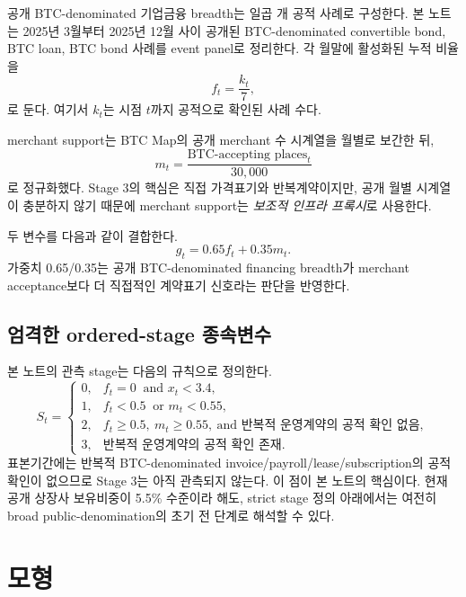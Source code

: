 \documentclass[11pt,a4paper]{article}
\begin{document}
공개 BTC-denominated 기업금융 breadth는 일곱 개 공적 사례로 구성한다. 본 노트는 2025년 3월부터 2025년 12월 사이 공개된 BTC-denominated convertible bond, BTC loan, BTC bond 사례를 event panel로 정리한다. 각 월말에 활성화된 누적 비율을
\begin{equation}
 f_t = \frac{k_t}{7},
\end{equation}
로 둔다. 여기서 $k_t$는 시점 $t$까지 공적으로 확인된 사례 수다.

merchant support는 BTC Map의 공개 merchant 수 시계열을 월별로 보간한 뒤,
\begin{equation}
 m_t = \frac{\text{BTC-accepting places}_t}{30{,}000}
\end{equation}
로 정규화했다. Stage 3의 핵심은 직접 가격표기와 반복계약이지만, 공개 월별 시계열이 충분하지 않기 때문에 merchant support는 \emph{보조적 인프라 프록시}로 사용한다.

두 변수를 다음과 같이 결합한다.
\begin{equation}
 g_t = 0.65 f_t + 0.35 m_t.
\end{equation}
가중치 0.65/0.35는 공개 BTC-denominated financing breadth가 merchant acceptance보다 더 직접적인 계약표기 신호라는 판단을 반영한다.

\subsection{엄격한 ordered-stage 종속변수}

본 노트의 관측 stage는 다음의 규칙으로 정의한다.
\begin{equation}
S_t=
\begin{cases}
0, & f_t=0\ \text{ and } x_t<3.4,\\
1, & f_t<0.5\ \text{ or } m_t<0.55,\\
2, & f_t\ge 0.5,\ m_t\ge 0.55,\ \text{and 반복적 운영계약의 공적 확인 없음},\\
3, & \text{반복적 운영계약의 공적 확인 존재}.
\end{cases}
\end{equation}
표본기간에는 반복적 BTC-denominated invoice/payroll/lease/subscription의 공적 확인이 없으므로 Stage 3는 아직 관측되지 않는다. 이 점이 본 노트의 핵심이다. 현재 공개 상장사 보유비중이 5.5\% 수준이라 해도, strict stage 정의 아래에서는 여전히 broad public-denomination의 초기 전 단계로 해석할 수 있다.

\section{모형}
\end{document}
